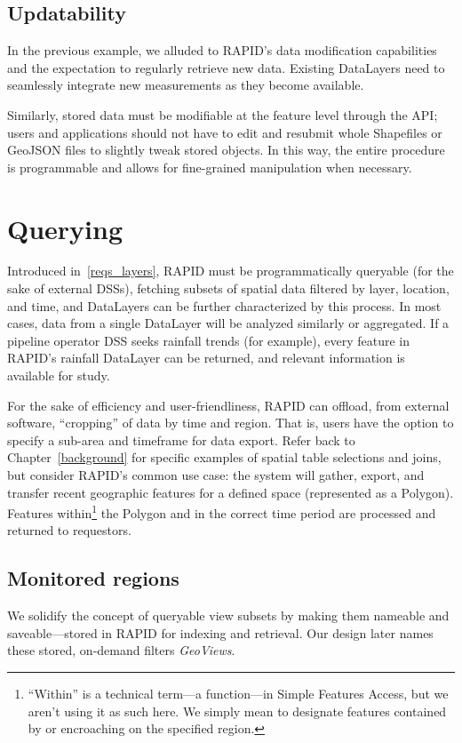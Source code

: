 \subsection{Updatability}
In the previous example, we alluded to RAPID's data modification capabilities and the expectation to regularly retrieve new data. Existing DataLayers need to seamlessly integrate new measurements as they become available.

Similarly, stored data must be modifiable at the feature level through the API; users and applications should not have to edit and resubmit whole Shapefiles or GeoJSON files to slightly tweak stored objects. In this way, the entire procedure is programmable and allows for fine-grained manipulation when necessary.

\section{Querying}

Introduced in~\ref{reqs_layers}, RAPID must be programmatically queryable (for the sake of external DSSs), fetching subsets of spatial data filtered by layer, location, and time, and DataLayers can be further characterized by this process. In most cases, data from a single DataLayer will be analyzed similarly or aggregated. If a pipeline operator DSS seeks rainfall trends (for example), every feature in RAPID's rainfall DataLayer can be returned, and relevant information is available for study.

For the sake of efficiency and user-friendliness, RAPID can offload, from external software, ``cropping'' of data by time and region. That is, users have the option to specify a sub-area and timeframe for data export. Refer back to Chapter~\ref{background} for specific examples of spatial table selections and joins, but consider RAPID's common use case: the system will gather, export, and transfer recent geographic features for a defined space (represented as a Polygon). Features within\footnote{``Within'' is a technical term---a function---in Simple Features Access, but we aren't using it as such here. We simply mean to designate features contained by or encroaching on the specified region.} the Polygon and in the correct time period are processed and returned to requestors.

\subsection{Monitored regions}
We solidify the concept of queryable view subsets by making them nameable and saveable---stored in RAPID for indexing and retrieval. Our design later names these stored, on-demand filters \textit{GeoViews}.

